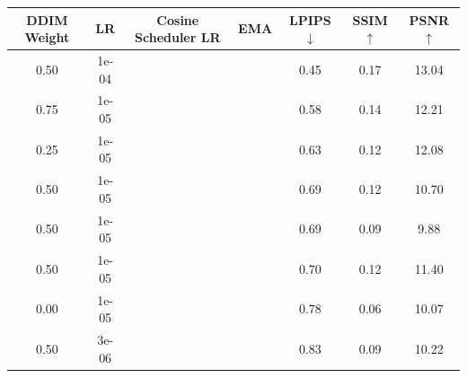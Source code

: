 \documentclass[11pt,twocolumn]{article}
\newcommand{\cmark}{\checkmark}
\newcommand{\xmark}{\ding{55}}
\begin{document}
\begin{table}[t]
  \centering

  \begin{subtable}[t]{\textwidth}
    \centering
    \vspace{0pt}
    \begin{tabular}{cccc|ccc}
    \toprule
    \textbf{DDIM Weight} & \textbf{LR} & \textbf{Cosine Scheduler LR} & \textbf{EMA} & \textbf{LPIPS} $\downarrow$ & \textbf{SSIM} $\uparrow$ & \textbf{PSNR} $\uparrow$ \\
    \midrule
    0.50 & 1e-04 & \xmark & \xmark & 0.45 & 0.17 & 13.04 \\
    0.75 & 1e-05 & \xmark & \xmark & 0.58 & 0.14 & 12.21 \\
    0.25 & 1e-05 & \xmark & \xmark & 0.63 & 0.12 & 12.08 \\
    0.50 & 1e-05 & \cmark & \xmark & 0.69 & 0.12 & 10.70 \\
    0.50 & 1e-05 & \xmark & \xmark & 0.69 & 0.09 & 9.88 \\
    0.50 & 1e-05 & \xmark & \cmark & 0.70 & 0.12 & 11.40 \\
    0.00 & 1e-05 & \xmark & \xmark & 0.78 & 0.06 & 10.07 \\
    0.50 & 3e-06 & \xmark & \xmark & 0.83 & 0.09 & 10.22 \\
    \bottomrule
    \end{tabular}
    \label{tab:hyperparams}
  \end{subtable}

  \vspace{1em} %


\end{table}
\end{document}

